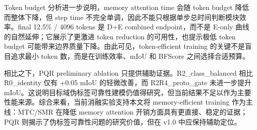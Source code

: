 Token budget 分析进一步说明，memory attention time 会随 token budget 降低而整体下降，但 step time 不完全单调，因此不能只根据单步总时间判断模块效率。final 12.5\% / 4096 tokens 是 D+E combined endpoint，而不是 E-only 曲线的自然延伸；它展示了更激进 token reduction 的可用性，也提示极低 token budget 可能带来边界质量下降。由此可见，token-efficient training 的关键不是盲目追求最小 token 数，而是在训练效率、mIoU 和 BFScore 之间选择合适预算。

相比之下，PQR preliminary ablation 只提供辅助证据。R2\_class\_balanced 相比 R0\_identity 仅有 +0.05 mIoU 的轻微改善，而 R2R4\_proto\_gate 未进一步提升 mIoU。这说明目标域伪标签可靠性建模仍值得研究，但当前结果不足以作为主要性能来源。综合来看，当前消融实验支持本文将 memory-efficient training 作为主线：MTC/SMR 在降低 memory attention 开销方面具有更直接、稳定的证据；PQR 则揭示了伪标签可靠性问题的研究价值，但在 v1.0 中应保持辅助定位。
